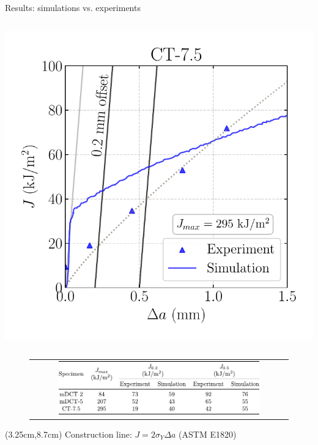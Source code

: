 \documentclass[9pt]{beamer}
\begin{document}
\begin{frame}{Results: simulations vs. experiments}
\begin{columns}
        \centering
        \includegraphics[width=1.0\textwidth]{Images/plot_J-da_CT_X52.pdf}
    \end{columns}

    \begin{figure}
        \begin{tabular}{c}
            \includegraphics[width=0.8\textwidth]{Images/tab_J-da.pdf} \\
        \end{tabular}
    \end{figure}

    \begin{textblock*}{7cm}(3.25cm,8.7cm)
        \small Construction line: $J = 2 \sigma_Y \Delta a$ (ASTM E1820)
    \end{textblock*}

\end{frame}

\end{document}
